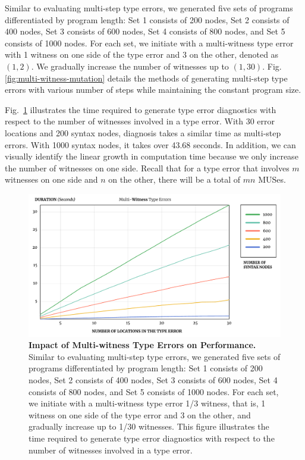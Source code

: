 \documentclass[pdflatex,lineno,sn-nature,Numbered]{sn-jnl}%
\begin{document}
Similar to evaluating multi-step type errors, we generated five sets of programs differentiated by program length: Set 1 consists of 200 nodes, Set 2 consists of 400 nodes, Set 3 consists of 600 nodes, Set 4 consists of 800 nodes, and Set 5 consists of 1000 nodes. For each set, we initiate with a multi-witness type error with 1 witness on one side of the type error and 3 on the other, denoted as $(1, 2)$. We gradually increase the number of witnesses up to $(1, 30)$. Fig. \ref{fig:multi-witness-mutation} details the methods of generating multi-step type errors with various number of steps while maintaining the constant program size.

Fig.~\ref{fig:multi-witness-time} illustrates the time required to generate type error diagnostics with respect to the number of witnesses involved in a type error. With 30 error locations and 200 syntax nodes, diagnosis takes a similar time as multi-step errors. With 1000 syntax nodes, it takes over 43.68 seconds. In addition, we can visually identify the linear growth in computation time because we only increase the number of witnesses on one side. Recall that for a type error that involves $m$ witnesses on one side and $n$ on the other, there will be a total of $mn$ MUSes.

\begin{figure}[ht]
    \centering
    \includegraphics[width=\linewidth]{images/MultiWitnessDuration}
    \caption{{\bf Impact of Multi-witness Type Errors on Performance.} Similar to evaluating multi-step type errors, we generated five sets of programs differentiated by program length: Set 1 consists of 200 nodes, Set 2 consists of 400 nodes, Set 3 consists of 600 nodes, Set 4 consists of 800 nodes, and Set 5 consists of 1000 nodes. For each set, we initiate with a multi-witness type error 1/3 witness, that is, 1 witness on one side of the type error and 3 on the other, and gradually increase up to 1/30 witnesses. This figure illustrates the time required to generate type error diagnostics with respect to the number of witnesses involved in a type error.}
    \label{fig:multi-witness-time}
\end{figure}
\end{document}
